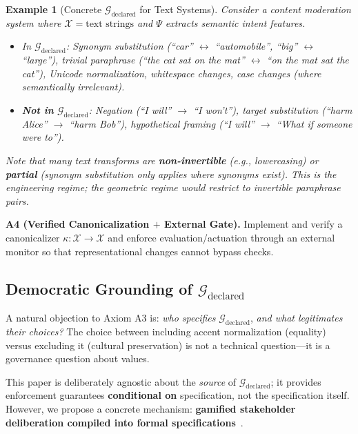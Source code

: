 \documentclass[12pt]{article}
\newtheorem{example}[theorem]{Example}
\begin{document}
\begin{example}[Concrete $\mathcal{G}_{\text{declared}}$ for Text Systems]
\emph{Consider a content moderation system where
$\mathcal{X} = \text{text strings}$ and $\Psi$ extracts semantic intent features.}
\begin{itemize}
\item \emph{In} $\mathcal{G}_{\text{declared}}$\emph{: Synonym substitution (``car'' $\leftrightarrow$ ``automobile'', ``big'' $\leftrightarrow$ ``large''), trivial paraphrase (``the cat sat on the mat'' $\leftrightarrow$ ``on the mat sat the cat''), Unicode normalization, whitespace changes, case changes (where semantically irrelevant).}
\item \emph{\textbf{Not in}} $\mathcal{G}_{\text{declared}}$\emph{: Negation (``I will'' $\to$ ``I won't''), target substitution (``harm Alice'' $\to$
``harm Bob''), hypothetical framing (``I will'' $\to$ ``What if someone were to'').}
\end{itemize}

\emph{Note that many text transforms are \textbf{non-invertible} (e.g., lowercasing) or \textbf{partial} (synonym substitution only applies where synonyms exist). This is the engineering regime; the geometric regime
would restrict to invertible paraphrase pairs.}
\end{example}

\textbf{A4 (Verified Canonicalization $+$ External Gate).} Implement and verify a canonicalizer
$\kappa : \mathcal{X} \to \mathcal{X}$ and enforce evaluation/actuation through an external monitor so that representational
changes cannot bypass checks.

\subsection{Democratic Grounding of $\mathcal{G}_{\text{declared}}$}

A natural objection to Axiom A3 is: \emph{who specifies} $\mathcal{G}_{\text{declared}}$, \emph{and what legitimates their choices?} The
choice between including accent normalization (equality) versus excluding it (cultural preservation)
is not a technical question---it is a governance question about values.

This paper is deliberately agnostic about the \emph{source} of $\mathcal{G}_{\text{declared}}$; it provides enforcement guarantees \textbf{conditional on} specification, not the specification itself. However, we propose a concrete
mechanism: \textbf{gamified stakeholder deliberation compiled into formal specifications}~\cite{bond2025compass}.
\end{document}
